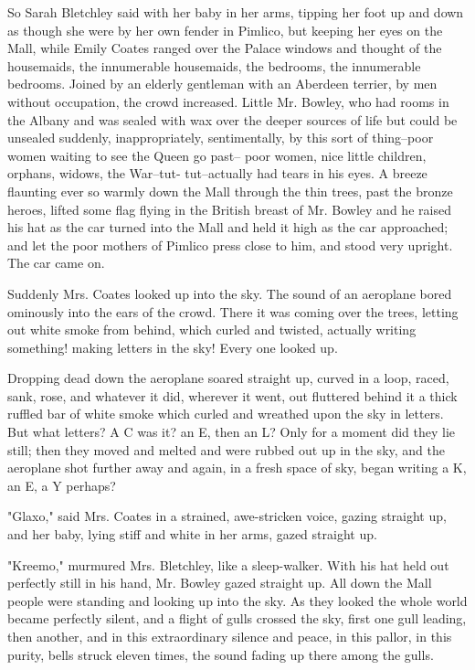 \documentclass[lang=cn,10pt]{elegantbook}
\begin{document}
So Sarah Bletchley said with her baby in her arms, tipping her foot
up and down as though she were by her own fender in Pimlico, but
keeping her eyes on the Mall, while Emily Coates ranged over the
Palace windows and thought of the housemaids, the innumerable
housemaids, the bedrooms, the innumerable bedrooms.  Joined by an
elderly gentleman with an Aberdeen terrier, by men without
occupation, the crowd increased.  Little Mr. Bowley, who had rooms
in the Albany and was sealed with wax over the deeper sources of
life but could be unsealed suddenly, inappropriately, sentimentally,
by this sort of thing--poor women waiting to see the Queen go past--
poor women, nice little children, orphans, widows, the War--tut-
tut--actually had tears in his eyes.  A breeze flaunting ever so
warmly down the Mall through the thin trees, past the bronze heroes,
lifted some flag flying in the British breast of Mr. Bowley and he
raised his hat as the car turned into the Mall and held it high as
the car approached; and let the poor mothers of Pimlico press close
to him, and stood very upright.  The car came on.

Suddenly Mrs. Coates looked up into the sky.  The sound of an
aeroplane bored ominously into the ears of the crowd.  There it was
coming over the trees, letting out white smoke from behind, which
curled and twisted, actually writing something! making letters in
the sky!  Every one looked up.

Dropping dead down the aeroplane soared straight up, curved in a
loop, raced, sank, rose, and whatever it did, wherever it went, out
fluttered behind it a thick ruffled bar of white smoke which curled
and wreathed upon the sky in letters.  But what letters?  A C was
it? an E, then an L?  Only for a moment did they lie still; then
they moved and melted and were rubbed out up in the sky, and the
aeroplane shot further away and again, in a fresh space of sky,
began writing a K, an E, a Y perhaps?

"Glaxo," said Mrs. Coates in a strained, awe-stricken voice, gazing
straight up, and her baby, lying stiff and white in her arms, gazed
straight up.

"Kreemo," murmured Mrs. Bletchley, like a sleep-walker.  With his
hat held out perfectly still in his hand, Mr. Bowley gazed straight
up.  All down the Mall people were standing and looking up into the
sky.  As they looked the whole world became perfectly silent, and a
flight of gulls crossed the sky, first one gull leading, then
another, and in this extraordinary silence and peace, in this
pallor, in this purity, bells struck eleven times, the sound fading
up there among the gulls.
\end{document}
